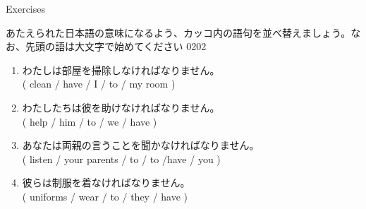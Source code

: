 \documentclass[aspectratio=169,xcolor={dvipsnames,table}]{beamer}
\newcommand{\myaudio}[1]{\href{#1}{\faVolumeUp}}
\begin{document}
\begin{frame}[plain]{Exercises}

{\small あたえられた日本語の意味になるよう、カッコ内の語句を並べ替えましょう。なお、先頭の語は大文字で始めてください}%
\hfill{\tiny 0202}\,{\scriptsize \myaudio{./audio/014_have_to_02.mp3}}
\begin{enumerate}
 \item わたしは部屋を掃除しなければなりません。\\
( clean / have / I / to / my room )\hspace{20pt}
 \item わたしたちは彼を助けなければなりません。\\
( help / him / to / we / have )\hspace{20pt}
 \item あなたは両親の言うことを聞かなければなりません。\\
( listen / your parents / to / to /have / you )\\
 \item 彼らは制服を着なければなりません。
\\
( uniforms / wear / to / they / have )\hspace{20pt}
\\%
\hfill{}
\end{enumerate} 
\end{frame}
\end{document}

